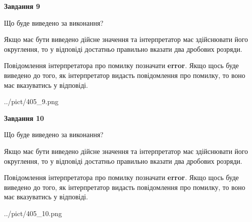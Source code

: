\documentclass[12pt, ukrainian]{article}
\begin{document}
{\begin {Large}
{\begin {center}\textbf{Завдання 9}\end {center}}\par
Що буде виведено за виконання? \par

Якщо має бути виведено дійсне значення та інтерпретатор має здійснювати його округлення, 
то у відповіді достатньо правильно вказати два дробових розряди.

Повідомлення інтерпретатора про помилку позначати \textbf{error}.
Якщо щось буде виведено до того, як інтерпретатор видасть повідомлення про помилку, 
то воно має вказуватись у відповіді. \par

\begin{center}
	{../pict/405_9.png}
\end{center}
\newpage

{\begin {center}\textbf{Завдання 10}\end {center}}\par
Що буде виведено за виконання? \par

Якщо має бути виведено дійсне значення та інтерпретатор має здійснювати його округлення, 
то у відповіді достатньо правильно вказати два дробових розряди.

Повідомлення інтерпретатора про помилку позначати \textbf{error}.
Якщо щось буде виведено до того, як інтерпретатор видасть повідомлення про помилку, 
то воно має вказуватись у відповіді. \par

\begin{center}
	{../pict/405_10.png}
\end{center}
\newpage

\end {Large}}
\end{document}
